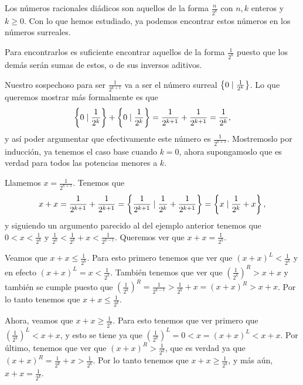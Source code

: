     \begin{example}
        Los n\'umeros racionales di\'adicos son aquellos de la forma $\frac{n}{2^k}$ con $n, k$ enteros y $k \ge 0$. Con lo que hemos estudiado, ya podemos encontrar estos n\'umeros en los n\'umeros surreales.

        Para encontrarlos es suficiente encontrar aquellos de la forma $\frac{1}{2^k}$ puesto que los dem\'as ser\'an sumas de estos, o de sus inversos aditivos.

        Nuestro sospechoso para ser $\frac{1}{2^{k+1}}$ va a ser el n\'umero surreal $\left\{0\mid \frac{1}{2^k}\right\}$. Lo que queremos mostrar m\'as formalmente es que 
        \[
            \left\{0\mid \frac{1}{2^{k}}\right\} + \left\{0\mid \frac{1}{2^{k}}\right\} = \frac{1}{2^{k+1}} + \frac{1}{2^{k+1}} = \frac{1}{2^k},
        \]
        y as\'i poder argumentar que efectivamente este n\'umero es $\frac{1}{2^{k+1}}$. Mostremoslo por inducci\'on, ya tenemos el caso base cuando $k=0$, ahora supongamoslo que es verdad para todos las potencias menores a $k$.

        Llamemos $x = \frac{1}{2^{k+1}}$. Tenemos que
        \[
            x + x = \frac{1}{2^{k+1}} + \frac{1}{2^{k+1}} = \left\{\frac{1}{2^{k+1}}\mid \frac{1}{2^{k}} +\frac{1}{2^{k+1}}\right\} = \left\{x\mid \frac{1}{2^k} + x\right\},
        \]
        y siguiendo un argumento parecido al del ejemplo anterior tenemos que $0 < x < \frac{1}{2^k}$ y $\frac{1}{2^k} < \frac{1}{2^k} + x < \frac{1}{2^{k-1}}$. Queremos ver que $x+x = \frac{1}{2^{k}}$.

        Veamos que $x+x\le \frac{1}{2^k}$. Para esto primero tenemos que ver que $(x+x)^L < \frac{1}{2^k}$ y en efecto $(x+x)^L = x < \frac{1}{2^k}$. Tambi\'en tenemos que ver que $(\frac{1}{2^k})^R > x+x$ y tambi\'en se cumple puesto que $(\frac{1}{2^k})^R = \frac{1}{2^{k-1}} > \frac{1}{2^k} + x = (x+x)^R > x+x$. Por lo tanto tenemos que $x+x\le \frac{1}{2^k}$.

        Ahora, veamos que $x+x\ge \frac{1}{2^k}$. Para esto tenemos que ver primero que $(\frac{1}{2^k})^L < x+x$, y esto se tiene ya que $(\frac{1}{2^k})^L = 0 < x = (x+x)^L < x+x$. Por \'ultimo, tenemos que ver que $(x+x)^R > \frac{1}{2^k}$, que es verdad ya que $(x+x)^R = \frac{1}{2^k} + x > \frac{1}{2^k}$. Por lo tanto tenemos que $x+x\ge \frac{1}{2^k}$, y m\'as a\'un, $x+x = \frac{1}{2^k}$.

    \end{example}